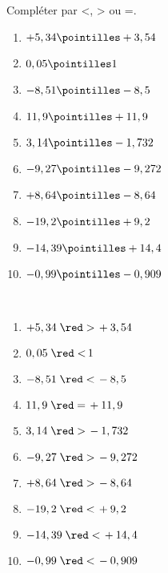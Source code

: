 \begin{exercice*}
    Compléter par <, > ou =.
    {\baselineskip=7mm
    \begin{multicols}{2}
      \begin{enumerate}
         \item $+5,34 \pointilles +3,54$
         \item $0,05 \pointilles 1$
         \item $-8,51 \pointilles -8,5$
         \item $11,9 \pointilles +11,9$
         \item $3,14 \pointilles -1,732$
         \item $-9,27 \pointilles -9,272$
         \item $+8,64 \pointilles -8,64$
         \item $-19,2 \pointilles +9,2$
         \item $-14,39 \pointilles +14,4$
         \item $-0,99 \pointilles -0,909$
      \end{enumerate}
   \end{multicols}
   }
   
 \end{exercice*}
 
 \begin{corrige}
    \ \\ [-7mm]
    {\baselineskip=7mm
    \begin{multicols}{2}
      \begin{enumerate}
         \item $+5,34 \; {\red >} \, +3,54$
         \item $0,05 \; {\red <} \, 1$
         \item $-8,51 \; {\red <} \, -8,5$
         \item $11,9 \; {\red =} \, +11,9$
         \item $3,14 \; {\red >} \, -1,732$
         \item $-9,27 \; {\red >} \, -9,272$
         \item $+8,64 \; {\red >} \, -8,64$
         \item $-19,2 \; {\red <} \, +9,2$
         \item $-14,39 \; {\red <} \, +14,4$
         \item $-0,99 \; {\red <} \, -0,909$
      \end{enumerate}
   \end{multicols}      
   }
 \end{corrige}